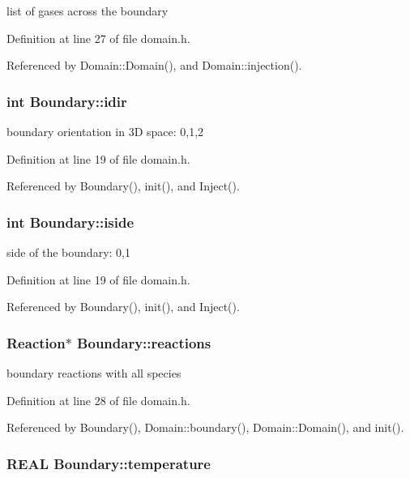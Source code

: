 list of gases across the boundary 



Definition at line 27 of file domain.h.

Referenced by Domain::Domain(), and Domain::injection().\hypertarget{structBoundary_509bdaf3fb8190c074a4d95ad12584ed}{
\subsubsection[{idir}]{\setlength{\rightskip}{0pt plus 5cm}int {\bf Boundary::idir}}}
\label{structBoundary_509bdaf3fb8190c074a4d95ad12584ed}


boundary orientation in 3D space: 0,1,2 



Definition at line 19 of file domain.h.

Referenced by Boundary(), init(), and Inject().\hypertarget{structBoundary_e488ee304ed8d50941a4e8240582d815}{
\subsubsection[{iside}]{\setlength{\rightskip}{0pt plus 5cm}int {\bf Boundary::iside}}}
\label{structBoundary_e488ee304ed8d50941a4e8240582d815}


side of the boundary: 0,1 



Definition at line 19 of file domain.h.

Referenced by Boundary(), init(), and Inject().\hypertarget{structBoundary_b681ca73b68c662547f29ab64ee245e3}{
\subsubsection[{reactions}]{\setlength{\rightskip}{0pt plus 5cm}Reaction$\ast$ {\bf Boundary::reactions}}}
\label{structBoundary_b681ca73b68c662547f29ab64ee245e3}


boundary reactions with all species 

Definition at line 28 of file domain.h.

Referenced by Boundary(), Domain::boundary(), Domain::Domain(), and init().\hypertarget{structBoundary_74b059e4119e1739800fa93615f74ac2}{
\subsubsection[{temperature}]{\setlength{\rightskip}{0pt plus 5cm}REAL {\bf Boundary::temperature}}}
\label{structBoundary_74b059e4119e1739800fa93615f74ac2}


